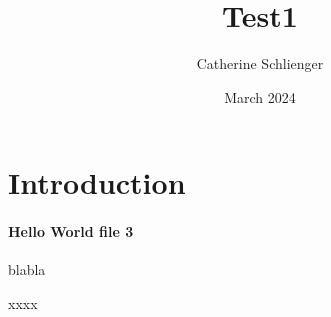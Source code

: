 \documentclass{article}
\title{Test1}
\author{Catherine Schlienger}
\date{March 2024}
\begin{document}
\maketitle

\section{Introduction}
\paragraph{Hello World file 3}

blabla

xxxx
\end{document}
